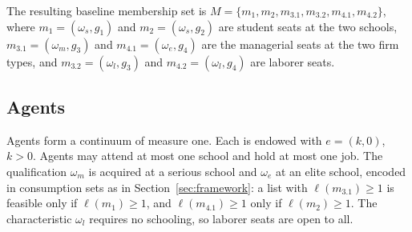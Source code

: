 \documentclass[12pt,letterpaper]{article}
\theoremstyle{definition}
\begin{document}
The resulting baseline membership set is $M=\{m_1,m_2,m_{3.1},m_{3.2},m_{4.1},m_{4.2}\}$, where $m_1=(\omega_s,g_1)$ and $m_2=(\omega_s,g_2)$ are student seats at the two schools, $m_{3.1}=(\omega_m,g_3)$ and $m_{4.1}=(\omega_e,g_4)$ are the managerial seats at the two firm types, and $m_{3.2}=(\omega_l,g_3)$ and $m_{4.2}=(\omega_l,g_4)$ are laborer seats.

\subsection{Agents}

Agents form a continuum of measure one.
Each is endowed with $e=(k,0)$, $k>0$.
Agents may attend at most one school and hold at most one job.
The qualification $\omega_m$ is acquired at a serious school and $\omega_e$ at an elite school, encoded in consumption sets as in Section~\ref{sec:framework}: a list with $\ell(m_{3.1})\geq 1$ is feasible only if $\ell(m_1)\geq 1$, and $\ell(m_{4.1})\geq 1$ only if $\ell(m_2)\geq 1$.
The characteristic $\omega_l$ requires no schooling, so laborer seats are open to all.
\end{document}
